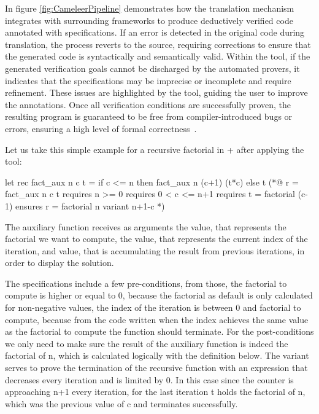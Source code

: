 In figure \ref{fig:CameleerPipeline} demonstrates how the translation mechanism integrates with surrounding frameworks to produce 
deductively verified \ocaml code annotated with \gospel specifications. If an error is detected in the original \ocaml code during 
translation, the process reverts to the source, requiring corrections to ensure that the generated \whyml code is syntactically and 
semantically valid. Within the \whythree tool, if the generated verification goals cannot be discharged by the automated provers, it indicates 
that the specifications may be imprecise or incomplete and require refinement. These issues are highlighted by the tool, guiding the 
user to improve the annotations. Once all verification conditions are successfully proven, the resulting program is guaranteed to 
be free from compiler-introduced bugs or errors, ensuring a high level of formal correctness~\cite{Filliatre11}.

Let us take this simple example for a recursive factorial in \ocaml + \gospel after applying the \cameleer tool:

\begin{gospell}
let rec fact_aux n c t =
  if c <= n then fact_aux n (c+1) (t*c) else t
(*@
  r = fact_aux n c t
  requires n >= 0
  requires 0 < c <= n+1
  requires t = factorial (c-1)
  ensures r = factorial n
  variant n+1-c
*)
\end{gospell}

The auxiliary function  receives as arguments the  value, that represents the factorial we want to 
compute, the  value, that represents the current index of the iteration, and  value, that is accumulating 
the result from previous iterations, in order to display the solution.

The specifications include a few pre-conditions, from those, the factorial to compute is higher or equal to 0, because the factorial as 
default is only calculated for non-negative values, the index of the iteration is between 0 and factorial to compute, because from the
code written when the index achieves the same value as the factorial to compute the function should terminate. For the post-conditions
we only need to make sure the result of the auxiliary function is indeed the factorial of n, which is calculated logically with the 
definition below. The variant serves to prove the termination of the recursive function with an expression that decreases every iteration
and is limited by 0. In this case since the counter is approaching n+1 every iteration, for the last iteration t holds the factorial of n,
which was the previous value of c and terminates successfully.

